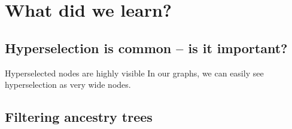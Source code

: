 \documentclass{beamer}
\begin{document}


\section{What did we learn?}

\subsection{Hyperselection is common -- is it important?}
\begin{frame}{Hyperselected nodes are highly visible}
In our graphs, we can easily see hyperselection as very wide nodes. 
\end{frame}


\subsection{Filtering ancestry trees}
\end{document}
